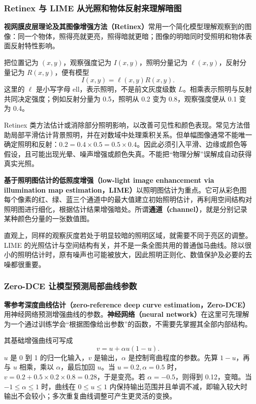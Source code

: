 \subsubsection*{Retinex 与 LIME 从光照和物体反射来理解暗图}

\textbf{视网膜皮层理论及其图像增强方法（Retinex）}常用一个简化模型理解观察到的图像：同一个物体，照得亮就更亮，照得暗就更暗；图像的明暗同时受照明和物体表面反射特性影响。

把位置记为 $(x,y)$，观察强度记为 $I(x,y)$，照明分量记为 $\ell(x,y)$，反射分量记为 $R(x,y)$，便有模型
\[
I(x,y)=\ell(x,y)R(x,y).
\]
这里的 $\ell$ 是小写字母 ell，表示照明，不是前文灰度级数 $L$。相乘表示照明与反射共同决定强度；例如反射分量为 0.5，照明从 0.2 变为 0.8，观察强度便从 0.1 变为 0.4。

Retinex 类方法估计或消除部分照明影响，以改善可见性和颜色表现。常见方法借助局部平滑估计背景照明，并在对数域中处理乘积关系。但单幅图像通常不能唯一确定照明和反射：$0.2=0.4\times0.5=0.5\times0.4$。因此必须引入平滑、边缘或颜色等假设，且可能出现光晕、噪声增强或颜色失真。不能把“物理分解”误解成自动获得真实光照。

\textbf{基于照明图估计的低照度增强（low-light image enhancement via illumination map estimation，LIME）}以照明图估计为重点。它可从彩色图每个像素的红、绿、蓝三个通道中的最大值建立初始照明估计，再利用空间结构对照明图进行细化，根据估计结果增强暗处。所谓\textbf{通道（channel）}，就是分别记录某种颜色分量的一张数值图。

直观上，同样的观察灰度若处于明显较暗的照明区域，就需要不同于亮区的调整。LIME 的光照估计与空间结构有关，并不是一条全图共用的普通伽马曲线。除以很小的照明估计时，原有噪声也可能被放大，因此照明正则化、数值保护及必要的去噪都很重要。

\subsubsection*{Zero-DCE 让模型预测局部曲线参数}

\textbf{零参考深度曲线估计（zero-reference deep curve estimation，Zero-DCE）}用神经网络预测增强曲线的参数。\textbf{神经网络（neural network）}在这里可先理解为一个通过训练学会“根据图像给出参数”的函数，不需要先掌握其全部内部结构。

其基础增强曲线可写成
\[
v=u+\alpha u(1-u).
\]
$u$ 是 0 到 1 的归一化输入，$v$ 是输出，$\alpha$ 是控制弯曲程度的参数。先算 $1-u$，再与 $u$ 相乘，乘以 $\alpha$，最后加回 $u$。当 $u=0.2,\alpha=0.5$ 时，$v=0.2+0.5\times0.2\times0.8=0.28$，于是变亮。若 $\alpha=-0.5$，则得到 0.12，变暗。当 $-1\le\alpha\le1$ 时，曲线在 $0\le u\le1$ 内保持输出范围并且单调不减，即输入较大时输出不会较小；多次重复曲线调整可产生更灵活的变换。

